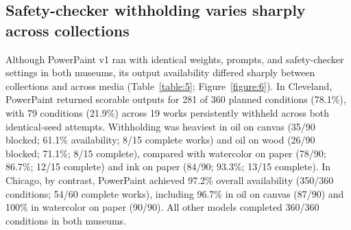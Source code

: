 \documentclass[applsci,article,submit,pdftex,moreauthors]{Definitions/mdpi}
\begin{document}
\subsection{Safety-checker withholding varies sharply across collections}\label{safety-checker-withholding-varies-sharply-across-collections}

Although PowerPaint v1 ran with identical weights, prompts, and safety-checker settings in both museums, its output availability differed sharply between collections and across media (Table~\ref{table:5}; Figure~\ref{figure:6}). In Cleveland, PowerPaint returned scorable outputs for 281 of 360 planned conditions (78.1\%), with 79 conditions (21.9\%) across 19 works persistently withheld across both identical-seed attempts. Withholding was heaviest in oil on canvas (35/90 blocked; 61.1\% availability; 8/15 complete works) and oil on wood (26/90 blocked; 71.1\%; 8/15 complete), compared with watercolor on paper (78/90; 86.7\%; 12/15 complete) and ink on paper (84/90; 93.3\%; 13/15 complete). In Chicago, by contrast, PowerPaint achieved 97.2\% overall availability (350/360 conditions; 54/60 complete works), including 96.7\% in oil on canvas (87/90) and 100\% in watercolor on paper (90/90). All other models completed 360/360 conditions in both museums.
\end{document}
